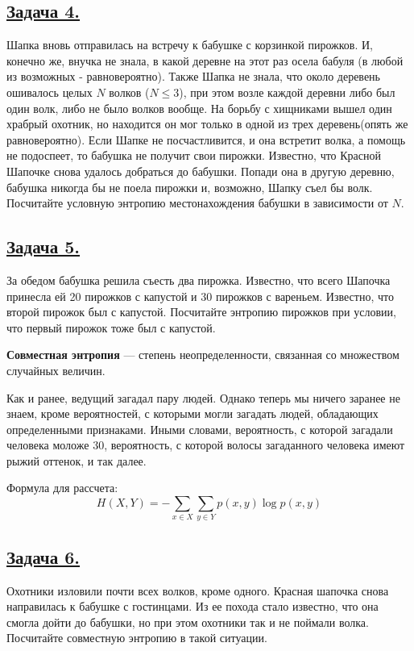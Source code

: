 \subsection*{\hyperref[sec:sol_problem4]{Задача 4.}}\label{sec:problem4} Шапка вновь отправилась на встречу к бабушке с корзинкой пирожков. И, конечно же, внучка не знала, в какой деревне на этот раз осела бабуля (в любой из возможных - равновероятно). Также Шапка не знала, что около деревень ошивалось целых $N$ волков ($N\leqslant3$), при этом возле каждой деревни либо был один волк, либо не было волков вообще. На борьбу с хищниками вышел один храбрый охотник, но находится он мог только в одной из трех деревень(опять же равновероятно). Если Шапке не посчастливится, и она встретит волка, а помощь не подоспеет, то бабушка не получит свои пирожки. Известно, что Красной Шапочке снова удалось добраться до бабушки. Попади она в другую деревню, бабушка никогда бы не поела пирожки и, возможно, Шапку съел бы волк. Посчитайте условную энтропию местонахождения бабушки в зависимости от $N$. 
\\

\subsection*{\hyperref[sec:sol_problem5]{Задача 5.}}\label{sec:problem5} За обедом бабушка решила съесть два пирожка. Известно, что всего Шапочка принесла ей 20 пирожков с капустой и 30 пирожков с вареньем. Известно, что второй пирожок был с капустой. Посчитайте энтропию пирожков при условии, что первый пирожок тоже был с капустой.

\begin{siderules}
    \textbf{Совместная энтропия} --- степень неопределенности, связанная со множеством случайных величин.
\end{siderules}

Как и ранее, ведущий загадал пару людей. Однако теперь мы ничего заранее не знаем, кроме вероятностей, с которыми могли загадать людей, обладающих определенными признаками. Иными словами, вероятность, с которой загадали человека моложе 30, вероятность, с которой волосы загаданного человека имеют рыжий оттенок, и так далее.

Формула для рассчета:
\[H(X, Y)=-\sum\limits_{x\in X}\sum\limits_{y\in Y} p(x, y)\log p(x ,y) \]


\subsection*{\hyperref[sec:sol_problem6]{Задача 6.}}\label{sec:problem6}Охотники изловили почти всех волков, кроме одного. Красная шапочка снова направилась к бабушке с гостинцами. Из ее похода стало известно, что она смогла дойти до бабушки, но при этом охотники так и не поймали волка. Посчитайте совместную энтропию в такой ситуации. 

